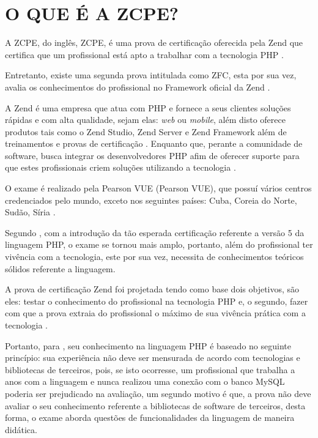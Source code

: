 \chapter{O QUE É A ZCPE?}
\label{zcpe}

A \acs{ZCPE}, do inglês, \acl{ZCPE}, é uma prova de certificação oferecida
pela Zend que certifica que um profissional está apto a trabalhar com a
tecnologia \acs{PHP} \cite{websiteZendZCPE}.

Entretanto, existe uma segunda prova intitulada como \ac{ZFC},
esta por sua vez, avalia os conhecimentos do profissional no
Framework oficial da Zend \cite{websiteZendZFC}.

A Zend é uma empresa que atua com \acs{PHP} e fornece a seus clientes soluções 
rápidas e com alta qualidade, sejam elas: \textit{web} ou \textit{mobile}, além
disto oferece produtos tais como o \acs{Zend Studio}, \acs{Zend Server} e 
\acs{Zend Framework} além de treinamentos e provas de certificação 
\cite{websiteZendCompany}. Enquanto que, perante a comunidade de software, busca
integrar os desenvolvedores \acs{PHP} afim de oferecer suporte para que estes 
profissionais criem soluções utilizando a tecnologia \cite{websiteZendCompany}.

O exame é realizado pela \acs{Pearson VUE} (\acl{Pearson VUE}), que possuí
vários centros credenciados pelo mundo, exceto nos seguintes países: Cuba,
Coreia do Norte, Sudão, Síria \cite{websiteZendZFC}.

Segundo , com a introdução da tão
esperada certificação referente a versão 5 da linguagem \acs{PHP}, o exame se
tornou mais amplo, portanto, além do profissional ter vivência com a
tecnologia, este por sua vez, necessita de conhecimentos teóricos sólidos
referente a linguagem.

A prova de certificação Zend foi projetada tendo como base dois objetivos, são
eles: testar o conhecimento do profissional na tecnologia \acs{PHP} e, o
segundo, fazer com que a prova extraia do profissional o máximo de sua vivência 
prática com a tecnologia \cite{theZendPHPCertificationPracticeTestBook}.

Portanto, para , seu
conhecimento na linguagem \acs{PHP} é baseado no seguinte princípio: sua
experiência não deve ser mensurada de acordo com tecnologias
e bibliotecas de terceiros, pois, se isto ocorresse, um profissional que
trabalha a anos com a linguagem e nunca realizou uma conexão com o banco 
\acs{MySQL} poderia ser prejudicado na avaliação, um segundo motivo é que, a
prova não deve avaliar o seu conhecimento referente a bibliotecas de software
de terceiros, desta forma, o exame aborda questões de funcionalidades da 
linguagem  de maneira didática.

